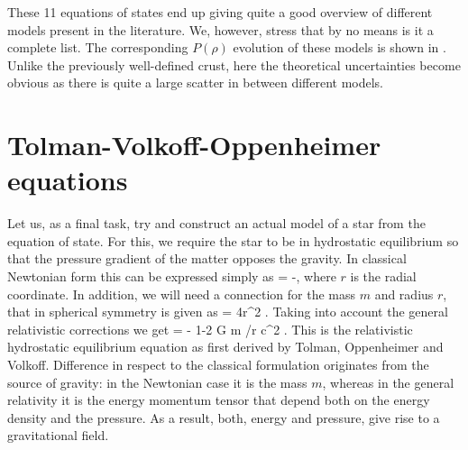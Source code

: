 These 11 equations of states end up giving quite a good overview of different models present in the literature.
We, however, stress that by no means is it a complete list.
The corresponding $P(\rho)$ evolution of these models is shown in .
Unlike the previously well-defined crust, here the theoretical uncertainties become obvious as there is quite a large scatter in between different models.


\section{Tolman-Volkoff-Oppenheimer equations}
Let us, as a final task, try and construct an actual model of a star from the equation of state.
For this, we require the star to be in hydrostatic equilibrium so that the pressure gradient of the matter opposes the gravity.
In classical Newtonian form this can be expressed simply as
\be\label{eq:hydrobal}
 = -,
\ee
where $r$ is the radial coordinate.
In addition, we will need a connection for the mass $m$ and radius $r$, that in spherical symmetry is given as
\be
{} = 4\pi r^2 \rho.
\ee
Taking into account the general relativistic corrections we get
\be\label{eq:hydrobalGR}
 = 
    - \times 
    {1-2 G m /r c^2 }.
\ee
This is the relativistic hydrostatic equilibrium equation as first derived by Tolman\cite{Tolman39}, Oppenheimer and Volkoff\cite{OV39}.
Difference in respect to the classical formulation originates from the source of gravity:
in the Newtonian case it is the mass $m$, whereas in the general relativity it is the energy momentum tensor that depend both on the energy density and the pressure.
As a result, both, energy and pressure, give rise to a gravitational field.



